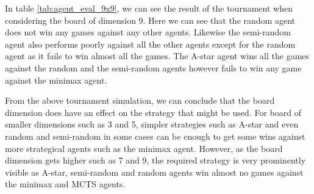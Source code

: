  In table \ref{tab:agent_eval_9x9}, we can see the result of the tournament when  considering the board of dimension 9. Here we can see that the random agent does not win any games against any other agents. Likewise the semi-random agent also performs poorly against all the other agents except for the random agent as it fails to win almost all the games. The A-star agent wins all the games against the random and the semi-random agents however fails to win any game against the minimax agent.

 From the above tournament simulation, we can conclude that the board dimension does have an effect on the strategy that might be used. For board of smaller dimensions such as 3 and 5, simpler strategies such as A-star and even random and semi-random in some cases can be enough to get some wins against more strategical agents such as the minimax agent. However, as the board dimension gets higher such as 7 and 9, the required strategy is very prominently visible as A-star, semi-random and random agents win almost no games against the minimax and MCTS agents.